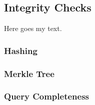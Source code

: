 \subsection{Integrity Checks}

Here goes my text.

\subsubsection{Hashing}
\subsubsection{Merkle Tree}
\subsubsection{Query Completeness}